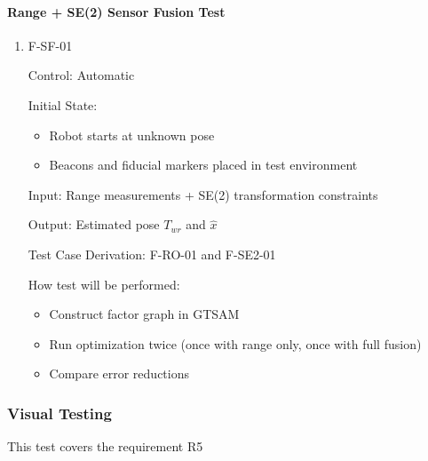 \documentclass[12pt, titlepage]{article}
\begin{document}
\paragraph{Range + SE(2) Sensor Fusion Test}
\begin{enumerate}
\item{F-SF-01\\}

Control: Automatic
					
Initial State: 
\begin{itemize}
  \item Robot starts at unknown pose
  \item Beacons and fiducial markers placed in test environment
\end{itemize}
					
Input: Range measurements + SE(2) transformation constraints

Output: Estimated pose $T_{wr}$ and $\hat{x}$

Test Case Derivation: F-RO-01 and F-SE2-01

How test will be performed: 
\begin{itemize}
  \item Construct factor graph in GTSAM
  \item Run optimization twice (once with range only, once with full fusion)
  \item Compare error reductions
\end{itemize}

\end{enumerate}

\subsubsection{Visual Testing}
This test covers the requirement R5
\end{document}

